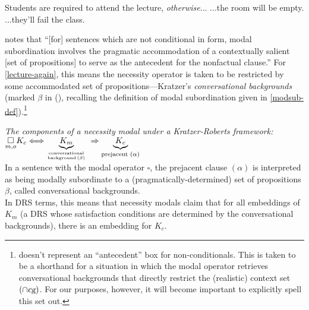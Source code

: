 \pex  \label{lecture-again}  Students are required to attend the lecture, \textit{otherwise}...
\a  {}...the room will be empty. \label{lecture-a}
\a  {}...they'll fail the class. \label{lecture-b}\xe


 notes that ``[for] sentences which are not conditional in form, modal subordination involves the pragmatic accommodation of a contextually salient [set of propositions] to serve as the antecedent for the nonfactual clause.'' For \ref{lecture-again}, this means the necessity operator is taken to be restricted by some accommodated set of propositions---Kratzer's \textit{conversational backgrounds} (marked $\beta$ in (\nextx), recalling the definition of modal subordination given in \ref{modsub-def}).\footnote{\citet{Roberts1989} doesn't represent an ``antecedent'' box for non-conditionals. This is taken to be a shorthand for a situation in which the modal operator retrieves conversational backgrounds that directly restrict the (realistic) context set $ (\cap \textsl{cg}) $. For our purposes, however, it will become important to explicitly spell this set out.} %

\pex  \textit{The components of a necessity modal under a Kratzer-Roberts framework:}\\ 
$\underset{m,o}{\square}K_c  \Longleftrightarrow \underbrace{K_m}_{\text{conversational} \atop{\text{background}\,(\beta)}}  \;\Rightarrow  \underbrace{K_c}_{\text{prejacent }(\alpha)}$\\
In a sentence with the modal operator $ \square $, the prejacent clause $ (\alpha) $ is interpreted as being modally subordinate to a (pragmatically-determined) set of propositions $ \beta$, called conversational backgrounds.\\ In DRS terms, this means that necessity modals claim that for all embeddings of $ K_m $ (a DRS whose satisfaction conditions are determined by the conversational backgrounds), there is an embedding for $ K_c $.\xe%

